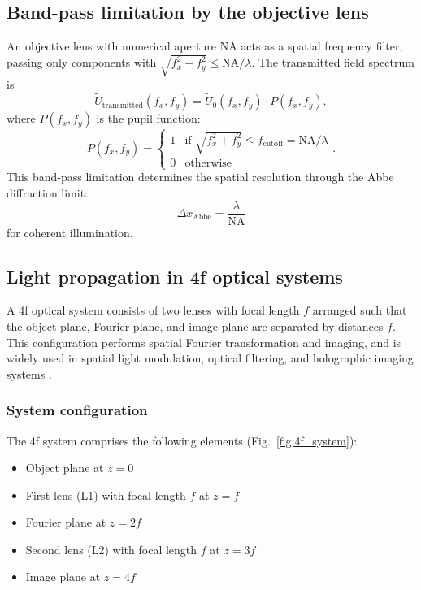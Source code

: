 \subsection{Band-pass limitation by the objective lens}

An objective lens with numerical aperture NA acts as a spatial frequency filter, passing only components with $\sqrt{f_x^2 + f_y^2} \leq \mathrm{NA}/\lambda$. The transmitted field spectrum is
\begin{equation}
\tilde{U}_{\mathrm{transmitted}}(f_x, f_y) = \tilde{U}_0(f_x, f_y) \cdot P(f_x, f_y),
\end{equation}
where $P(f_x, f_y)$ is the pupil function:
\begin{equation}
P(f_x, f_y) = \begin{cases}
1 & \text{if } \sqrt{f_x^2 + f_y^2} \leq f_{\mathrm{cutoff}} = \mathrm{NA}/\lambda \\
0 & \text{otherwise}
\end{cases}.
\end{equation}
This band-pass limitation determines the spatial resolution through the Abbe diffraction limit:
\begin{equation}
\label{eq:abbe}
\Delta x_{\mathrm{Abbe}} = \frac{\lambda}{\mathrm{NA}}
\end{equation}
for coherent illumination.

\subsection{Light propagation in 4f optical systems}

A 4f optical system consists of two lenses with focal length $f$ arranged such that the object plane, Fourier plane, and image plane are separated by distances $f$. This configuration performs spatial Fourier transformation and imaging, and is widely used in spatial light modulation, optical filtering, and holographic imaging systems \cite{goodman2005}.

\subsubsection{System configuration}

The 4f system comprises the following elements (Fig.~\ref{fig:4f_system}):
\begin{itemize}
\item Object plane at $z = 0$
\item First lens (L1) with focal length $f$ at $z = f$
\item Fourier plane at $z = 2f$
\item Second lens (L2) with focal length $f$ at $z = 3f$
\item Image plane at $z = 4f$
\end{itemize}

